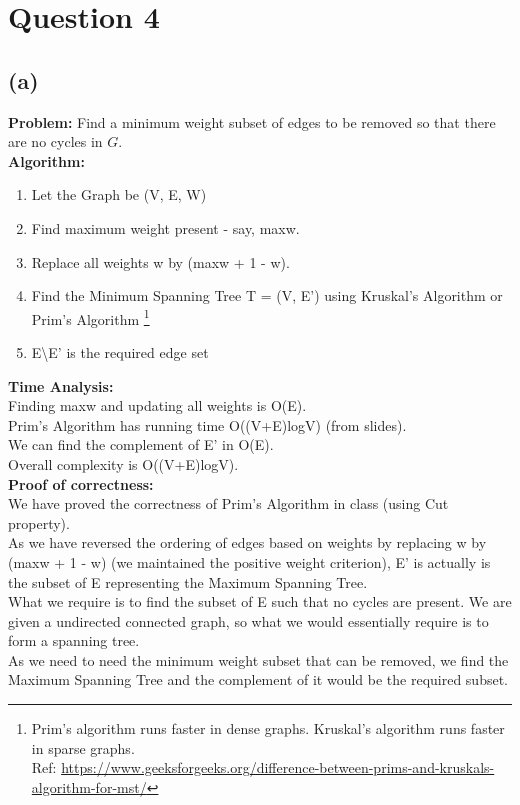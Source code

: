 \documentclass[11pt, fleqn]{article}
\begin{document}
 
\newpage 
\section*{Question 4}
\label{q4}
\setcounter{equation}{0}

\subsection*{(a)}

\textbf{Problem:} Find a minimum weight subset of edges to be removed so that there are no cycles in $G$. \\
\textbf{Algorithm:}
\begin{enumerate}
    \item Let the Graph be (V, E, W)
    \item Find maximum weight present - say, maxw.
    \item Replace all weights w by (maxw + 1 - w).
    \item Find the Minimum Spanning Tree T = (V, E') using Kruskal's Algorithm or Prim's Algorithm \footnote{Prim’s algorithm runs faster in dense graphs. Kruskal’s algorithm runs faster in sparse graphs. \\Ref: \url{https://www.geeksforgeeks.org/difference-between-prims-and-kruskals-algorithm-for-mst/}}
    \item E\textbackslash E' is the required edge set
\end{enumerate}
\textbf{Time Analysis:} \\
Finding maxw and updating all weights is O(E). \\
Prim's Algorithm has running time O((V+E)logV) (from slides). \\
We can find the complement of E' in O(E). \\
Overall complexity is O((V+E)logV). \\
\textbf{Proof of correctness:} \\
We have proved the correctness of Prim's Algorithm in class (using Cut property).\\
As we have reversed the ordering of edges based on weights by replacing w by (maxw + 1 - w) (we maintained the positive weight criterion), E' is actually is the subset of E representing the Maximum Spanning Tree. \\
What we require is to find the subset of E such that no cycles are present. We are given a undirected connected graph, so what we would essentially require is to form a spanning tree. \\
As we need to need the minimum weight subset that can be removed, we find the Maximum Spanning Tree and the complement of it would be the required subset. \\
\end{document}
